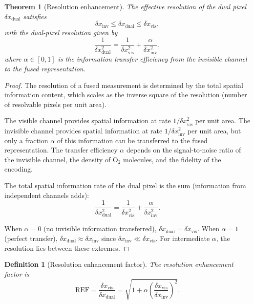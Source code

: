 \documentclass[11pt,twocolumn,a4paper]{article}
\newtheorem{theorem}{Theorem}
\newtheorem{definition}{Definition}
\begin{document}
\begin{theorem}[Resolution enhancement]\label{thm:resolution}
The effective resolution of the dual pixel $\delta x_{\mathrm{dual}}$ satisfies
\begin{equation}\label{eq:resolution_enhancement}
\delta x_{\mathrm{inv}} \leq \delta x_{\mathrm{dual}} \leq \delta x_{\mathrm{vis}},
\end{equation}
with the dual-pixel resolution given by
\begin{equation}\label{eq:dual_resolution}
\frac{1}{\delta x_{\mathrm{dual}}^2} = \frac{1}{\delta x_{\mathrm{vis}}^2} + \frac{\alpha}{\delta x_{\mathrm{inv}}^2},
\end{equation}
where $\alpha \in [0,1]$ is the information transfer efficiency from the invisible channel to the fused representation.
\end{theorem}
\begin{proof}
The resolution of a fused measurement is determined by the total spatial information content, which scales as the inverse square of the resolution (number of resolvable pixels per unit area).

The visible channel provides spatial information at rate $1/\delta x_{\mathrm{vis}}^2$ per unit area.
The invisible channel provides spatial information at rate $1/\delta x_{\mathrm{inv}}^2$ per unit area, but only a fraction $\alpha$ of this information can be transferred to the fused representation.
The transfer efficiency $\alpha$ depends on the signal-to-noise ratio of the invisible channel, the density of O$_2$ molecules, and the fidelity of the encoding.

The total spatial information rate of the dual pixel is the sum (information from independent channels adds):
\begin{equation}
\frac{1}{\delta x_{\mathrm{dual}}^2} = \frac{1}{\delta x_{\mathrm{vis}}^2} + \frac{\alpha}{\delta x_{\mathrm{inv}}^2}.
\end{equation}

When $\alpha = 0$ (no invisible information transferred), $\delta x_{\mathrm{dual}} = \delta x_{\mathrm{vis}}$.
When $\alpha = 1$ (perfect transfer), $\delta x_{\mathrm{dual}} \approx \delta x_{\mathrm{inv}}$ since $\delta x_{\mathrm{inv}} \ll \delta x_{\mathrm{vis}}$.
For intermediate $\alpha$, the resolution lies between these extremes.
\end{proof}

\begin{definition}[Resolution enhancement factor]\label{def:ref}
The resolution enhancement factor is
\begin{equation}\label{eq:ref}
\mathrm{REF} = \frac{\delta x_{\mathrm{vis}}}{\delta x_{\mathrm{dual}}} = \sqrt{1 + \alpha\left(\frac{\delta x_{\mathrm{vis}}}{\delta x_{\mathrm{inv}}}\right)^2}.
\end{equation}
\end{definition}
\end{document}
